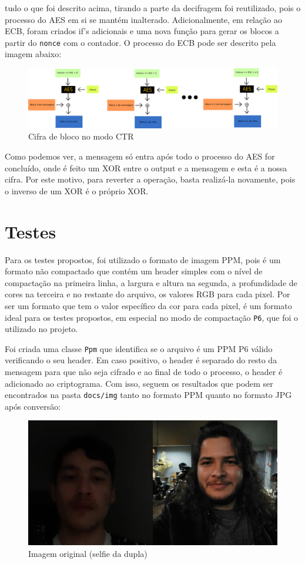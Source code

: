 \documentclass[12pt]{article}
\begin{document}
tudo o que foi descrito acima, tirando a parte da decifragem foi reutilizado, pois o processo do AES em si se mantém inalterado. Adicionalmente, em relação ao ECB, foram criados if's adicionais e uma nova função para gerar os blocos a partir do \texttt{nonce} com o contador. O processo do ECB pode ser descrito pela imagem abaixo:

\begin{figure}[H]
	\centering
    \includegraphics[width=\textwidth]{img/ctr.png}
    \caption{Cifra de bloco no modo CTR}
\end{figure}

Como podemos ver, a mensagem só entra após todo o processo do AES for concluído, onde é feito um XOR entre o output e a mensagem e esta é a nossa cifra. Por este motivo, para reverter a operação, basta realizá-la novamente, pois o inverso de um XOR é o próprio XOR.

\section{Testes}
Para os testes propostos, foi utilizado o formato de imagem PPM, pois é um formato não compactado que contém um header simples com o nível de compactação na primeira linha, a largura e altura na segunda, a profundidade de cores na terceira e no restante do arquivo, os valores RGB para cada pixel. Por ser um formato que tem o valor específico da cor para cada pixel, é um formato ideal para os testes propostos, em especial no modo de compactação \texttt{P6}, que foi o utilizado no projeto.

Foi criada uma classe \texttt{Ppm} que identifica se o arquivo é um PPM P6 válido verificando o seu header. Em caso positivo, o header é separado do resto da mensagem para que não seja cifrado e ao final de todo o processo, o header é adicionado ao criptograma. Com isso, seguem os resultados que podem ser encontrados na pasta \texttt{docs/img} tanto no formato PPM quanto no formato JPG após conversão:

\begin{figure}[H]
	\centering
    \includegraphics[width=.5\textwidth]{../sample/dupla.jpg}
    \caption{Imagem original (selfie da dupla)}
\end{figure}
\end{document}
